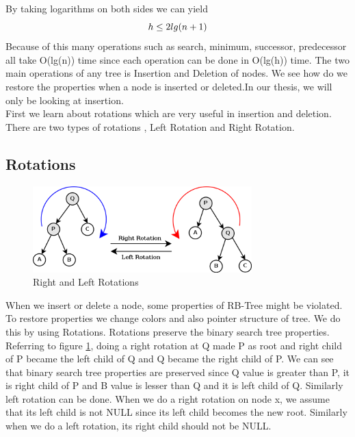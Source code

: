 \documentclass[BTech]{iitmdiss}
\begin{document}
By taking logarithms on both sides we can yield\\
\begin{equation}
        h \le 2lg(n+1)\\
\end{equation}
Because of this many operations such as search, minimum, successor, predecessor all take O(lg(n)) time since each operation can be done in O(lg(h)) time. The two main operations of any tree is Insertion and Deletion of nodes. We see how do we restore the properties when a node is inserted or deleted.In our thesis, we will only be looking at insertion.\\
First we learn about rotations which are very useful in insertion and deletion. There are two types of rotations , Left Rotation and Right Rotation.
\subsection{Rotations}
\begin{figure}[h]
    \centering
    \includegraphics{treap-rotation.png}
    \caption{Right and Left Rotations}
    \label{fig:rotation}
\end{figure}
When we insert or delete a node, some properties of RB-Tree might be violated. To restore properties we change colors and also pointer structure of tree. We do this by using Rotations. Rotations preserve the binary search tree properties.\\
Referring to figure \ref{fig:rotation}, doing a right rotation at Q  made P as root and right child of P became the left child of Q and Q became the right child of P. We can see that binary search tree properties are preserved since Q value is greater than P, it is right child of P and B value is lesser than Q and it is left child of Q. Similarly left rotation can be done. When we do a right rotation on node x, we assume that its left child is not NULL since its left child becomes the new root. Similarly when we do a left rotation, its right child should not be NULL.
\end{document}
